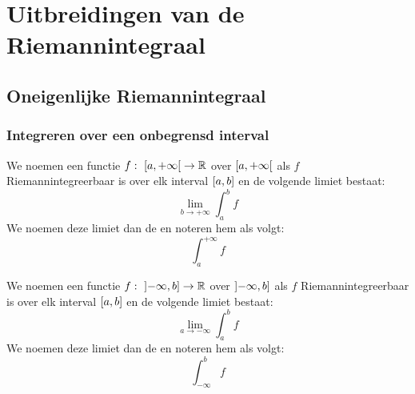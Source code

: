 \documentclass[main.tex]{subfiles}
\begin{document}
\section{Uitbreidingen van de Riemannintegraal}
\label{sec:uitbreidingen-van-de}

\subsection{Oneigenlijke Riemannintegraal}
\label{sec:oneig-riem}

\subsubsection{Integreren over een onbegrensd interval}
\label{sec:integreren-over-een}


\begin{de}
  We noemen een functie $f:\ \interval[open right]{a}{+\infty} \rightarrow \mathbb{R}$   over $\interval[open right]{a}{+\infty}$ als $f$ Riemannintegreerbaar is over elk interval $\interval{a}{b}$ en de volgende limiet bestaat:
  \[ \lim_{b\rightarrow +\infty}\int_{a}^{b}f \]
  We noemen deze limiet dan de  en noteren hem als volgt:
  \[ \int_{a}^{+\infty}f \]
\end{de}

\begin{de}
  We noemen een functie $f:\ \interval[open left]{-\infty}{b} \rightarrow \mathbb{R}$   over $\interval[open left]{-\infty}{b}$ als $f$ Riemannintegreerbaar is over elk interval $\interval{a}{b}$ en de volgende limiet bestaat:
  \[ \lim_{a\rightarrow -\infty}\int_{a}^{b}f \]
  We noemen deze limiet dan de  en noteren hem als volgt:
  \[ \int_{-\infty}^{b}f \]
\end{de}
\end{document}
